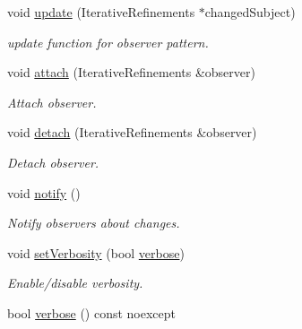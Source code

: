 \begin{DoxyCompactItemize}
\item 
\hypertarget{classSpacy_1_1Mixin_1_1IterativeRefinements_adcb6062728331e48515a05f539628062}{}void \hyperlink{classSpacy_1_1Mixin_1_1IterativeRefinements_adcb6062728331e48515a05f539628062}{update} (Iterative\+Refinements $\ast$changed\+Subject)\label{classSpacy_1_1Mixin_1_1IterativeRefinements_adcb6062728331e48515a05f539628062}

\begin{DoxyCompactList}\small\item\em update function for observer pattern. \end{DoxyCompactList}\item 
\hypertarget{classSpacy_1_1Mixin_1_1MixinConnection_abb5520ee6b22dd993d78f142939a1ed4}{}void \hyperlink{classSpacy_1_1Mixin_1_1MixinConnection_abb5520ee6b22dd993d78f142939a1ed4}{attach} (Iterative\+Refinements \&observer)\label{classSpacy_1_1Mixin_1_1MixinConnection_abb5520ee6b22dd993d78f142939a1ed4}

\begin{DoxyCompactList}\small\item\em Attach observer. \end{DoxyCompactList}\item 
\hypertarget{classSpacy_1_1Mixin_1_1MixinConnection_adda739590c487679c26f60e50aedb73f}{}void \hyperlink{classSpacy_1_1Mixin_1_1MixinConnection_adda739590c487679c26f60e50aedb73f}{detach} (Iterative\+Refinements \&observer)\label{classSpacy_1_1Mixin_1_1MixinConnection_adda739590c487679c26f60e50aedb73f}

\begin{DoxyCompactList}\small\item\em Detach observer. \end{DoxyCompactList}\item 
\hypertarget{classSpacy_1_1Mixin_1_1MixinConnection_a1ddeaa78a3bb4a38c2cca36d1f99fe36}{}void \hyperlink{classSpacy_1_1Mixin_1_1MixinConnection_a1ddeaa78a3bb4a38c2cca36d1f99fe36}{notify} ()\label{classSpacy_1_1Mixin_1_1MixinConnection_a1ddeaa78a3bb4a38c2cca36d1f99fe36}

\begin{DoxyCompactList}\small\item\em Notify observers about changes. \end{DoxyCompactList}\item 
void \hyperlink{classSpacy_1_1Mixin_1_1Verbosity_a0365d293ab27e27da9496c668020aefb}{set\+Verbosity} (bool \hyperlink{classSpacy_1_1Mixin_1_1Verbosity_ad367a7328578546938fd2a7e52ab3793}{verbose})
\begin{DoxyCompactList}\small\item\em Enable/disable verbosity. \end{DoxyCompactList}\item 
\hypertarget{classSpacy_1_1Mixin_1_1Verbosity_ad367a7328578546938fd2a7e52ab3793}{}bool \hyperlink{classSpacy_1_1Mixin_1_1Verbosity_ad367a7328578546938fd2a7e52ab3793}{verbose} () const noexcept\label{classSpacy_1_1Mixin_1_1Verbosity_ad367a7328578546938fd2a7e52ab3793}


\end{DoxyCompactItemize}

